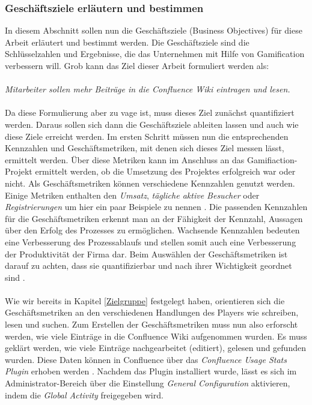 \documentclass[a4paper,12pt,twoside]{scrartcl}
\begin{document}
\subsubsection{Geschäftsziele erläutern und bestimmen}
\label{Geschäftsziele}
In diesem Abschnitt sollen nun die Geschäftsziele (Business Objectives) für diese Arbeit erläutert und bestimmt werden. Die Geschäftsziele sind die Schlüsselzahlen und Ergebnisse, die das Unternehmen mit Hilfe von Gamification verbessern will. Grob kann das Ziel dieser Arbeit formuliert werden als:
\\\\
\textit{Mitarbeiter sollen mehr Beiträge in die Confluence Wiki eintragen und lesen.}
\\\\
Da diese Formulierung aber zu vage ist, muss dieses Ziel zunächst quantifiziert werden. Daraus sollen sich dann die Geschäftsziele ableiten lassen und auch wie diese Ziele erreicht werden. Im ersten Schritt müssen nun die entsprechenden Kennzahlen und Geschäftsmetriken, mit denen sich dieses Ziel messen lässt, ermittelt werden. Über diese Metriken kann im Anschluss an das Gamifiaction-Projekt ermittelt werden, ob die Umsetzung des Projektes erfolgreich war oder nicht. Als Geschäftsmetriken können verschiedene Kennzahlen genutzt werden. Einige Metriken enthalten den \textit{Umsatz}, \textit{tägliche aktive Besucher} oder \textit{Registrierungen} um hier ein paar Beispiele zu nennen \cite{Dashboard}. Die passenden Kennzahlen für die Geschäftsmetriken erkennt man an der Fähigkeit der Kennzahl, Aussagen über den Erfolg des Prozesses zu ermöglichen. Wachsende Kennzahlen bedeuten eine Verbesserung des Prozessablaufs und stellen somit auch eine Verbesserung der Produktivität der Firma dar. Beim Auswählen der Geschäftsmetriken ist darauf zu achten, dass sie quantifizierbar und nach ihrer Wichtigkeit geordnet sind \cite{Dashboard}.
\\\\
Wie wir bereits in Kapitel \ref{Zielgruppe} festgelegt haben, orientieren sich die Geschäftsmetriken an den verschiedenen Handlungen des Players wie schreiben, lesen und suchen. Zum Erstellen der Geschäftsmetriken muss nun also erforscht werden, wie viele Einträge in die Confluence Wiki aufgenommen wurden. Es muss geklärt werden, wie viele Einträge nachgearbeitet (editiert), gelesen und gefunden wurden. Diese Daten können in Confluence über das \textit{Confluence Usage Stats Plugin} erhoben werden \cite{Plugin}. Nachdem das Plugin installiert wurde, lässt es sich im Administrator-Bereich über die Einstellung \textit{General Configuration} aktivieren, indem die \textit{Global Activity} freigegeben wird.
\end{document}
